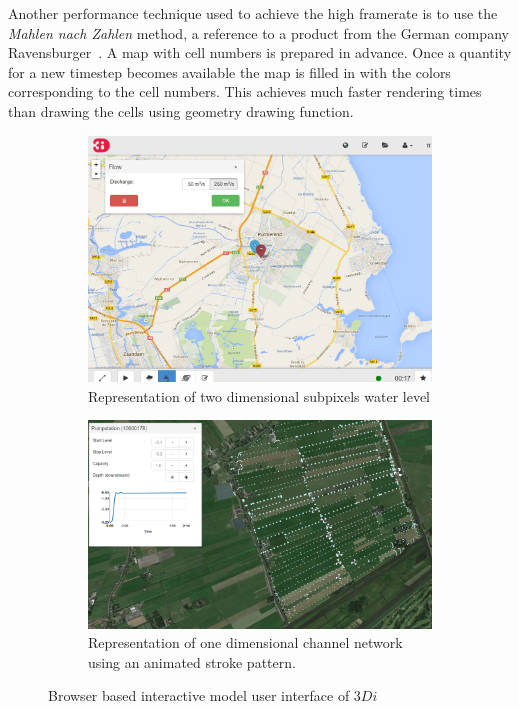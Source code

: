 \documentclass[a4paper]{article}
\DeclareRobustCommand{\threedi}{$3Di$~}
\begin{document}
Another performance technique used to achieve the high framerate is to use the \emph{Mahlen nach Zahlen} method, a reference to a product from the German company Ravensburger~\textregistered. A map with cell numbers is prepared in advance. Once a quantity for a new timestep becomes available the map is filled in with the colors corresponding to the cell numbers. This achieves much faster rendering times than drawing the cells using geometry drawing function.

\begin{figure}[htbp]
  \centering

  \begin{subfigure}{0.4\textwidth}
    \includegraphics[width=1\textwidth]{webgui}
    \caption{Representation of two dimensional subpixels water level}
    \label{fig:twod}
  \end{subfigure}
  \begin{subfigure}{0.4\textwidth}
    \includegraphics[width=1\textwidth]{oned}

    \caption{Representation of one dimensional channel network using an animated stroke pattern.}
    \label{fig:oned}
  \end{subfigure}
  \label{fig:gui}
  \caption{Browser based interactive model user interface of \threedi}
\end{figure}
\end{document}
